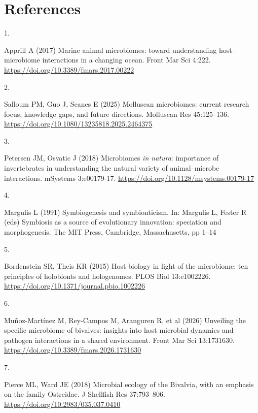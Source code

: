 \documentclass[
  12 pt,
]{article}
\newlength{\cslhangindent}
\newlength{\csllabelwidth}
\newenvironment{CSLReferences}[2] %
 {\begin{list}{}{%
  \setlength{\itemindent}{0pt}
  \setlength{\leftmargin}{0pt}
  \setlength{\parsep}{0pt}
  \ifodd #1
   \setlength{\leftmargin}{\cslhangindent}
   \setlength{\itemindent}{-1\cslhangindent}
  \fi
  \setlength{\itemsep}{#2\baselineskip}}}
 {\end{list}}
\newcommand{\CSLLeftMargin}[1]{\parbox[t]{\csllabelwidth}{\strut#1\strut}}
\newcommand{\CSLRightInline}[1]{\parbox[t]{\linewidth - \csllabelwidth}{\strut#1\strut}}
\begin{document}
\section{References}\label{references}

\protect{}\label{refs}
\begin{CSLReferences}{0}{0}
\CSLLeftMargin{1. }%
\CSLRightInline{Apprill A (2017) Marine animal microbiomes: toward understanding host--microbiome interactions in a changing ocean. Front Mar Sci 4:222. \url{https://doi.org/10.3389/fmars.2017.00222}}

\CSLLeftMargin{2. }%
\CSLRightInline{Salloum PM, Guo J, Scanes E (2025) Molluscan microbiomes: current research focus, knowledge gaps, and future directions. Molluscan Res 45:125--136. \url{https://doi.org/10.1080/13235818.2025.2464375}}

\CSLLeftMargin{3. }%
\CSLRightInline{Petersen JM, Osvatic J (2018) Microbiomes {{\emph{in natura}}}: importance of invertebrates in understanding the natural variety of animal--microbe interactions. mSystems 3:e00179-17. \url{https://doi.org/10.1128/msystems.00179-17}}

\CSLLeftMargin{4. }%
\CSLRightInline{Margulis L (1991) Symbiogenesis and symbionticism. In: Margulis L, Fester R (eds) Symbiosis as a source of evolutionary innovation: speciation and morphogenesis. The MIT Press, Cambridge, Massachusetts, pp 1--14}

\CSLLeftMargin{5. }%
\CSLRightInline{Bordenstein SR, Theis KR (2015) Host biology in light of the microbiome: ten principles of holobionts and hologenomes. PLOS Biol 13:e1002226. \url{https://doi.org/10.1371/journal.pbio.1002226}}

\CSLLeftMargin{6. }%
\CSLRightInline{Muñoz-Martínez M, Rey-Campos M, Aranguren R, et al (2026) Unveiling the specific microbiome of bivalves: insights into host microbial dynamics and pathogen interactions in a shared environment. Front Mar Sci 13:1731630. \url{https://doi.org/10.3389/fmars.2026.1731630}}

\CSLLeftMargin{7. }%
\CSLRightInline{Pierce ML, Ward JE (2018) Microbial ecology of the {Bivalvia}, with an emphasis on the family {Ostreidae}. J Shellfish Res 37:793--806. \url{https://doi.org/10.2983/035.037.0410}}


\end{CSLReferences}
\end{document}
